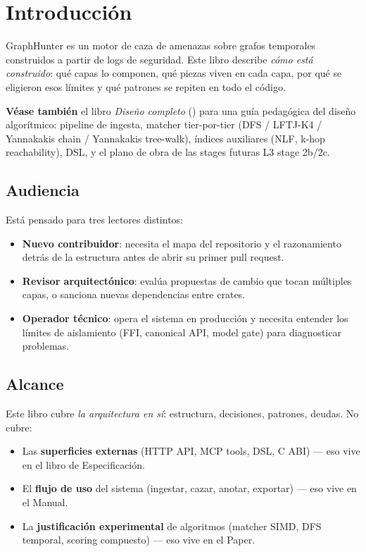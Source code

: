 \chapter{Introducción}
\label{sec:arq-introduccion}

GraphHunter es un motor de caza de amenazas sobre grafos temporales
construidos a partir de logs de seguridad. Este libro describe
\emph{cómo está construido}: qué capas lo componen, qué piezas viven
en cada capa, por qué se eligieron esos límites y qué patrones se
repiten en todo el código.

\textbf{Véase también} el libro \emph{Diseño completo}
() para una guía pedagógica
del diseño algorítmico: pipeline de ingesta, matcher tier-por-tier
(DFS / LFTJ-K4 / Yannakakis chain / Yannakakis tree-walk), índices
auxiliares (NLF, k-hop reachability), DSL, y el plano de obra de
las stages futuras L3 stage 2b/2c.

\section{Audiencia}

Está pensado para tres lectores distintos:

\begin{itemize}
    \item \textbf{Nuevo contribuidor}: necesita el mapa del
    repositorio y el razonamiento detrás de la estructura antes de
    abrir su primer pull request.
    \item \textbf{Revisor arquitectónico}: evalúa propuestas de
    cambio que tocan múltiples capas, o sanciona nuevas dependencias
    entre crates.
    \item \textbf{Operador técnico}: opera el sistema en producción
    y necesita entender los límites de aislamiento (FFI, canonical
    API, model gate) para diagnosticar problemas.
\end{itemize}

\section{Alcance}

Este libro cubre \emph{la arquitectura en sí}: estructura,
decisiones, patrones, deudas. No cubre:

\begin{itemize}
    \item Las \textbf{superficies externas} (HTTP API, MCP tools,
    DSL, C ABI) — eso vive en el libro de Especificación.
    \item El \textbf{flujo de uso} del sistema (ingestar, cazar,
    anotar, exportar) — eso vive en el Manual.
    \item La \textbf{justificación experimental} de algoritmos
    (matcher SIMD, DFS temporal, scoring compuesto) — eso vive en el
    Paper.
\end{itemize}

